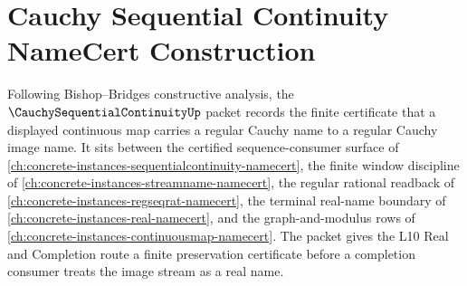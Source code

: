 \chapter{Cauchy Sequential Continuity NameCert Construction}
\label{ch:concrete-instances-cauchy-sequential-continuity-namecert}

Following Bishop--Bridges constructive analysis, the $\CauchySequentialContinuityUp$ packet records the finite certificate that a displayed continuous map carries a regular Cauchy name to a regular Cauchy image name. It sits between the certified sequence-consumer surface of \autoref{ch:concrete-instances-sequentialcontinuity-namecert}, the finite window discipline of \autoref{ch:concrete-instances-streamname-namecert}, the regular rational readback of \autoref{ch:concrete-instances-regseqrat-namecert}, the terminal real-name boundary of \autoref{ch:concrete-instances-real-namecert}, and the graph-and-modulus rows of \autoref{ch:concrete-instances-continuousmap-namecert}. The packet gives the L10 Real and Completion route a finite preservation certificate before a completion consumer treats the image stream as a real name.

